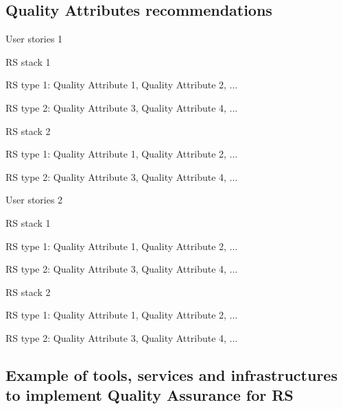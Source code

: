 \subsection{Quality Attributes recommendations}


User stories 1

RS stack 1

RS type 1: Quality Attribute 1, Quality Attribute 2, ...

RS type 2: Quality Attribute 3, Quality Attribute 4, ...


RS stack 2

RS type 1: Quality Attribute 1, Quality Attribute 2, ...

RS type 2: Quality Attribute 3, Quality Attribute 4, ...

User stories 2

RS stack 1

RS type 1: Quality Attribute 1, Quality Attribute 2, ...

RS type 2: Quality Attribute 3, Quality Attribute 4, ...


RS stack 2

RS type 1: Quality Attribute 1, Quality Attribute 2, ...

RS type 2: Quality Attribute 3, Quality Attribute 4, ...


\subsection{Example of tools, services and infrastructures to implement Quality Assurance for RS}

